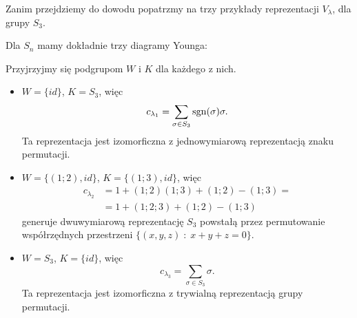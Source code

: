Zanim przejdziemy do dowodu popatrzmy na trzy przykłady reprezentacji $V_\lambda$, dla grupy $S_3$.
\begin{example}
  Dla $S_n$ mamy dokładnie trzy diagramy Younga:

  \begin{center}
  \end{center}

  Przyjrzyjmy się podgrupom $W$ i $K$ dla każdego z nich.
  \begin{itemize}
    \item[\buff{$\lambda_1$:}] $W=\{id\}$, $K=S_3$, więc 
      $$c_{\lambda_1}=\sum_{\sigma\in S_3}\operatorname{sgn}(\sigma)\sigma.$$ 
      Ta reprezentacja jest izomorficzna z jednowymiarową reprezentacją znaku permutacji.
    \item[\buff{$\lambda_2$:}] $W=\{(1;2), id\}$, $K=\{(1;3), id\}$, więc 
      \begin{align*}
        c_{\lambda_2}&=1+(1;2)(1;3)+(1;2)-(1;3)=\\ 
                     &=1+(1;2;3)+(1;2)-(1;3)
      \end{align*}
      generuje dwuwymiarową reprezentację $S_3$ powstałą przez permutowanie współrzędnych przestrzeni $\{(x,y,z)\;:\;x+y+z=0\}$.
    \item[\buff{$\lambda_3$:}] $W=S_3$, $K=\{id\}$, więc
      $$c_{\lambda_3}=\sum_{\sigma\in S_3}\sigma.$$
      Ta reprezentacja jest izomorficzna z trywialną reprezentacją grupy permutacji.
  \end{itemize}
  

\end{example}










